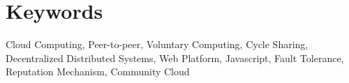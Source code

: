\section*{Keywords}

{\large
    \noindent Cloud Computing,
    \noindent Peer-to-peer,
    \noindent Voluntary Computing,
    \noindent Cycle Sharing,
    \noindent Decentralized Distributed Systems,
    \noindent Web Platform,
    \noindent Javascript,
    \noindent Fault Tolerance,
    \noindent Reputation Mechanism,
    \noindent Community Cloud
}


\cleardoublepage
\pagestyle{plain}
\def\contentsname{Index}
\tableofcontents
\newpage
\listoffigures
\newpage
\listoftables
\cleardoublepage

